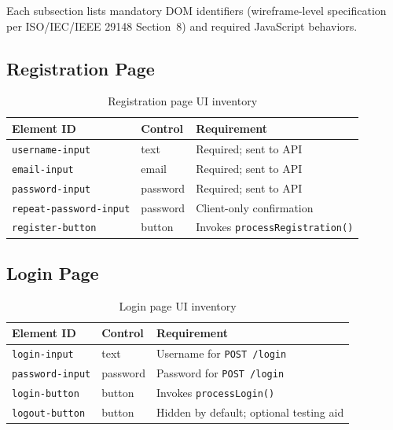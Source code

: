 \documentclass{article}
\begin{document}
Each subsection lists mandatory DOM identifiers (wireframe-level specification per ISO/IEC/IEEE 29148 Section~8) and required JavaScript behaviors.

\subsection{Registration Page}
\begin{table}[htbp]
\centering
\footnotesize
\begin{tabular}{@{}lll@{}}
\toprule
\textbf{Element ID} & \textbf{Control} & \textbf{Requirement} \\
\midrule
\texttt{username-input} & text & Required; sent to API \\
\texttt{email-input} & email & Required; sent to API \\
\texttt{password-input} & password & Required; sent to API \\
\texttt{repeat-password-input} & password & Client-only confirmation \\
\texttt{register-button} & button & Invokes \texttt{processRegistration()} \\
\bottomrule
\end{tabular}
\caption{Registration page UI inventory}
\end{table}

\subsection{Login Page}
\begin{table}[htbp]
\centering
\footnotesize
\begin{tabular}{@{}lll@{}}
\toprule
\textbf{Element ID} & \textbf{Control} & \textbf{Requirement} \\
\midrule
\texttt{login-input} & text & Username for \texttt{POST /login} \\
\texttt{password-input} & password & Password for \texttt{POST /login} \\
\texttt{login-button} & button & Invokes \texttt{processLogin()} \\
\texttt{logout-button} & button & Hidden by default; optional testing aid \\
\bottomrule
\end{tabular}
\caption{Login page UI inventory}
\end{table}
\end{document}
